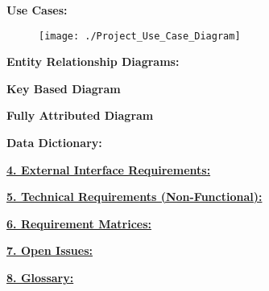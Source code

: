 \documentclass[12pt]{article}
\begin{document}
		
	\vspace{0.2in}
	
		\textbf{Use Cases:}
		\vspace{0.1in}
			\begin{figure}[htbp] %
				\centering
				\texttt{[image: ./Project\_Use\_Case\_Diagram]}
			\end{figure}
		
		
		
	\vspace{0.2in}
	
	\newpage
		\textbf{Entity Relationship Diagrams:}
		\vspace{0.2in}
		

		\vspace{0.1in}

			\begin{center}
			\textbf{Key Based Diagram}
			\end{center}
		
		\vspace{0.3in}
		
		
		\begin{center}
			\textbf{Fully Attributed Diagram}
			\end{center}
		
		\vspace{0.3in}
		
		

		
	\vspace{0.1in}
	
		\textbf{Data Dictionary:}
		\vspace{0.1in}
		
		
	\vspace{0.5in}
	
	\textbf{\underline{4. External Interface Requirements:}}
	\vspace{0.2in}
	
	
	
	\vspace{0.5in}
	
	\textbf{\underline{5. Technical Requirements (Non-Functional):}}
	\vspace{0.2in}
	
	
	\vspace{0.5in}
	
	\newpage
	\textbf{\underline{6. Requirement Matrices:}}
	\vspace{0.2in}
	
	
	
	\vspace{0.5in}
	
	\textbf{\underline{7. Open Issues:}}		
	\vspace{0.2in}
	
	
	
	\vspace{0.5in}
	
	\textbf{\underline{8. Glossary:}}
	\vspace{0.2in}
		
	
	\vspace{0.5in}
		
\end{document}

